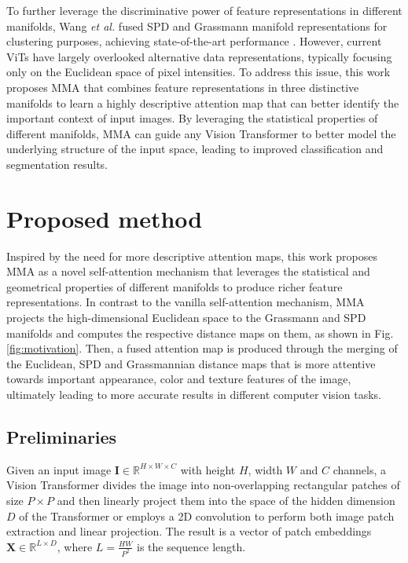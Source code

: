 \documentclass[10pt,twocolumn,letterpaper]{article}
\begin{document}
To further leverage the discriminative power of feature representations in different manifolds, Wang \emph{et al.} fused SPD and Grassmann manifold representations for clustering purposes, achieving state-of-the-art performance \cite{Author47}. However, current ViTs have largely overlooked alternative data representations, typically focusing only on the Euclidean space of pixel intensities. To address this issue, this work proposes MMA that combines feature representations in three distinctive manifolds to learn a highly descriptive attention map that can better identify the important context of input images. By leveraging the statistical properties of different manifolds, MMA can guide any Vision Transformer to better model the underlying structure of the input space, leading to improved classification and segmentation results.

\section{Proposed method}
\label{sec:method}

Inspired by the need for more descriptive attention maps, this work proposes MMA as a novel self-attention mechanism that leverages the statistical and geometrical properties of different manifolds to produce richer feature representations. In contrast to the vanilla self-attention mechanism, MMA projects the high-dimensional Euclidean space to the Grassmann and SPD manifolds and computes the respective distance maps on them, as shown in Fig. \ref{fig:motivation}. Then, a fused attention map is produced through the merging of the Euclidean, SPD and Grassmannian distance maps that is more attentive towards important appearance, color and texture features of the image, ultimately leading to more accurate results in different computer vision tasks.

\subsection{Preliminaries}

Given an input image $\textbf{I} \in \mathbb{R}^{H\times W \times C}$ with height $H$, width $W$ and $C$ channels, a Vision Transformer divides the image into non-overlapping rectangular patches of size $P \times P$ and then linearly project them into the space of the hidden dimension $D$ of the Transformer or employs a 2D convolution to perform both image patch extraction and linear projection. The result is a vector of patch embeddings $\textbf{X} \in \mathbb{R}^{L\times D}$, where $L = \frac{HW}{P^2}$ is the sequence length.
\end{document}
